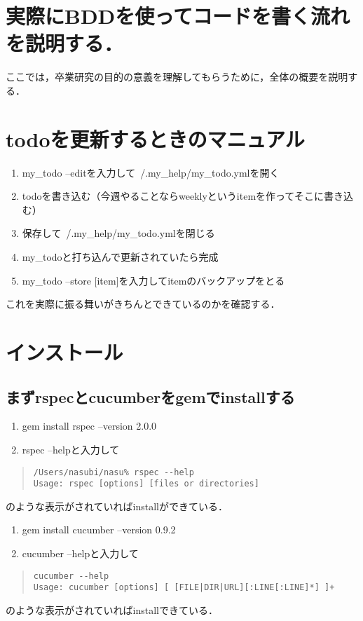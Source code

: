 \section{実際にBDDを使ってコードを書く流れを説明する．}
ここでは，卒業研究の目的の意義を理解してもらうために，全体の概要を説明する．

\section{todoを更新するときのマニュアル}\begin{enumerate}
\item my\_todo --editを入力して~/.my\_help/my\_todo.ymlを開く
\item todoを書き込む（今週やることならweeklyというitemを作ってそこに書き込む）
\item 保存して~/.my\_help/my\_todo.ymlを閉じる
\item my\_todoと打ち込んで更新されていたら完成
\item my\_todo --store [item]を入力してitemのバックアップをとる
\end{enumerate}
これを実際に振る舞いがきちんとできているのかを確認する．

\section{インストール}
\subsection{まずrspecとcucumberをgemでinstallする}\begin{enumerate}
\item gem install rspec --version 2.0.0
\item rspec --helpと入力して
\end{enumerate}\begin{quote}\begin{verbatim}
/Users/nasubi/nasu% rspec --help
Usage: rspec [options] [files or directories]
\end{verbatim}\end{quote}
のような表示がされていればinstallができている．
\begin{enumerate}
\item gem install cucumber --version 0.9.2
\item cucumber --helpと入力して
\end{enumerate}\begin{quote}\begin{verbatim}
cucumber --help
Usage: cucumber [options] [ [FILE|DIR|URL][:LINE[:LINE]*] ]+
\end{verbatim}\end{quote}
のような表示がされていればinstallできている．

